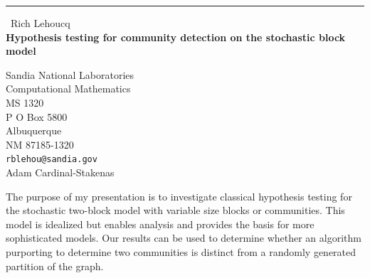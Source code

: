 \documentclass{report}
\begin{document}
\begin{center}
\rule{6in}{1pt} \
{\large Rich Lehoucq \\
{\bf Hypothesis testing for community detection on the stochastic block model}}

Sandia National Laboratories \\ Computational Mathematics \\ MS 1320 \\ P O Box 5800 \\ Albuquerque \\ NM 87185-1320
\\
{\tt rblehou@sandia.gov}\\
Adam Cardinal-Stakenas\end{center}

The purpose of my presentation is to investigate classical hypothesis
testing for the stochastic two-block model with variable size blocks or
communities. This model is idealized but
enables analysis and provides the basis for more sophisticated models.
Our results can be used to determine whether an algorithm purporting to
determine two communities is distinct from a randomly generated partition
of the graph.
\end{document}
